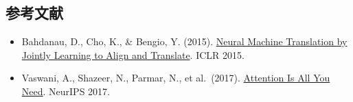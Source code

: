 \FloatBarrier
{}
\hypertarget{ux53c2ux8003ux6587ux732e-67}{%
\subsection{参考文献}\label{ux53c2ux8003ux6587ux732e-67}}

\vspace{0.25em}
\begin{itemize}
\tightlist
\item
  Bahdanau, D., Cho, K., \& Bengio, Y. (2015). \href{https://arxiv.org/abs/1409.0473}{Neural Machine Translation by Jointly Learning to Align and Translate}. ICLR 2015.
\item
  Vaswani, A., Shazeer, N., Parmar, N., et al.~(2017). \href{https://arxiv.org/abs/1706.03762}{Attention Is All You Need}. NeurIPS 2017.
\end{itemize}

\clearpage
